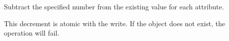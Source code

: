 Subtract the specified number from the existing value for each attribute.

This decrement is atomic with the write.  If the object does not exist, the
operation will fail.





